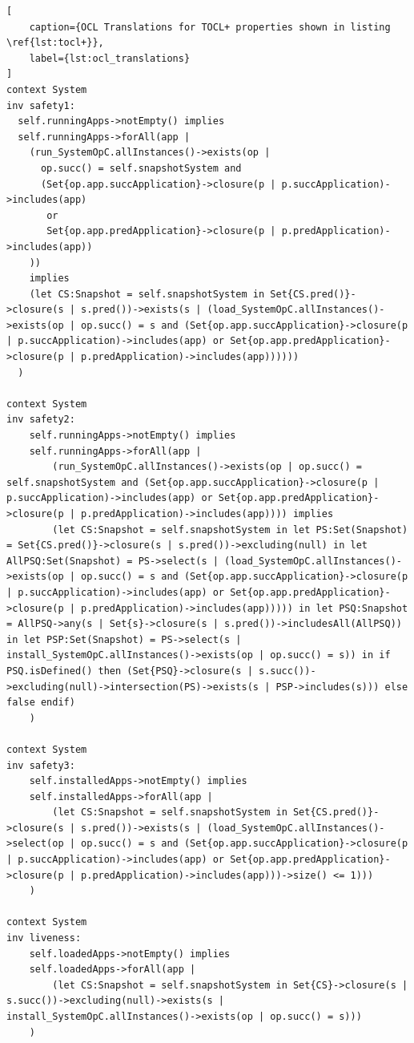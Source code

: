 \begin{lstlisting}[
    caption={OCL Translations for TOCL+ properties shown in listing \ref{lst:tocl+}},
    label={lst:ocl_translations}
]
context System
inv safety1:
  self.runningApps->notEmpty() implies
  self.runningApps->forAll(app |
    (run_SystemOpC.allInstances()->exists(op | 
      op.succ() = self.snapshotSystem and 
      (Set{op.app.succApplication}->closure(p | p.succApplication)->includes(app) 
       or 
       Set{op.app.predApplication}->closure(p | p.predApplication)->includes(app))
    )) 
    implies
    (let CS:Snapshot = self.snapshotSystem in Set{CS.pred()}->closure(s | s.pred())->exists(s | (load_SystemOpC.allInstances()->exists(op | op.succ() = s and (Set{op.app.succApplication}->closure(p | p.succApplication)->includes(app) or Set{op.app.predApplication}->closure(p | p.predApplication)->includes(app))))))
  )

context System
inv safety2:
    self.runningApps->notEmpty() implies
    self.runningApps->forAll(app |
        (run_SystemOpC.allInstances()->exists(op | op.succ() = self.snapshotSystem and (Set{op.app.succApplication}->closure(p | p.succApplication)->includes(app) or Set{op.app.predApplication}->closure(p | p.predApplication)->includes(app)))) implies
        (let CS:Snapshot = self.snapshotSystem in let PS:Set(Snapshot) = Set{CS.pred()}->closure(s | s.pred())->excluding(null) in let AllPSQ:Set(Snapshot) = PS->select(s | (load_SystemOpC.allInstances()->exists(op | op.succ() = s and (Set{op.app.succApplication}->closure(p | p.succApplication)->includes(app) or Set{op.app.predApplication}->closure(p | p.predApplication)->includes(app))))) in let PSQ:Snapshot = AllPSQ->any(s | Set{s}->closure(s | s.pred())->includesAll(AllPSQ)) in let PSP:Set(Snapshot) = PS->select(s | install_SystemOpC.allInstances()->exists(op | op.succ() = s)) in if PSQ.isDefined() then (Set{PSQ}->closure(s | s.succ())->excluding(null)->intersection(PS)->exists(s | PSP->includes(s))) else false endif)
    )

context System
inv safety3:
    self.installedApps->notEmpty() implies
    self.installedApps->forAll(app |
        (let CS:Snapshot = self.snapshotSystem in Set{CS.pred()}->closure(s | s.pred())->exists(s | (load_SystemOpC.allInstances()->select(op | op.succ() = s and (Set{op.app.succApplication}->closure(p | p.succApplication)->includes(app) or Set{op.app.predApplication}->closure(p | p.predApplication)->includes(app)))->size() <= 1)))
    )

context System
inv liveness:
    self.loadedApps->notEmpty() implies
    self.loadedApps->forAll(app |
        (let CS:Snapshot = self.snapshotSystem in Set{CS}->closure(s | s.succ())->excluding(null)->exists(s | install_SystemOpC.allInstances()->exists(op | op.succ() = s)))
    )


\end{lstlisting}
